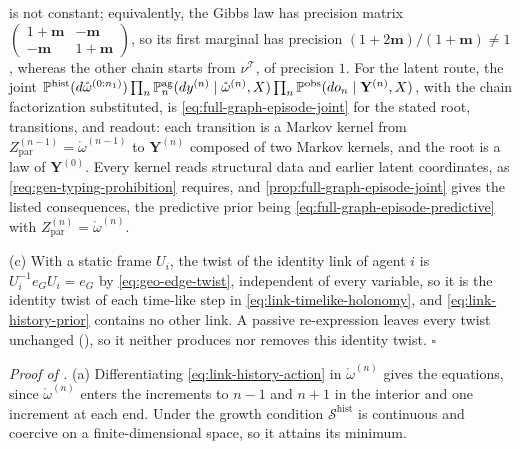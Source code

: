 is not constant; equivalently, the Gibbs law has precision matrix
$\left(\begin{smallmatrix}1+\mathbf m&-\mathbf m\\-\mathbf m&1+\mathbf m\end{smallmatrix}\right)$, so
its first marginal has precision $(1+2\mathbf m)/(1+\mathbf m)\neq1$, whereas the other chain starts
from $\nu^{\mathscr T}$, of precision $1$. For the
latent route, the joint
$\mathbb P^{\mathrm{hist}}(d\mathring\omega^{(0:n_1)})\prod_n\mathbb P^{\mathrm{ag}}_n(dy^{(n)}\mid\mathring\omega^{(n)},X)\prod_n\mathbb P^{\mathrm{obs}}(do_n\mid\mathbf Y^{(n)},X)$,
with the chain factorization substituted, is \eqref{eq:full-graph-episode-joint} for the stated root,
transitions, and readout: each transition is a Markov kernel from
$Z^{(n-1)}_{\mathrm{par}}=\mathring\omega^{(n-1)}$ to $\mathbf Y^{(n)}$ composed of two Markov kernels,
and the root is a law of $\mathbf Y^{(0)}$. Every kernel reads structural data and earlier latent
coordinates, as \cref{req:gen-typing-prohibition} requires, and \cref{prop:full-graph-episode-joint}
gives the listed consequences, the predictive prior being
\eqref{eq:full-graph-episode-predictive} with $Z^{(n)}_{\mathrm{par}}=\mathring\omega^{(n)}$.

(c) With a static frame $U_i$, the twist of the identity link of agent $i$ is
$U_i^{-1}e_GU_i=e_G$ by \eqref{eq:geo-edge-twist}, independent of every variable, so it is the
identity twist of each time-like step in \eqref{eq:link-timelike-holonomy}, and
\eqref{eq:link-history-prior} contains no other link. A passive re-expression leaves every twist
unchanged (), so it neither produces nor removes this identity
twist. \hfill$\square$

\noindent\emph{Proof of .}
(a) Differentiating \eqref{eq:link-history-action} in $\mathring\omega^{(n)}$ gives the equations,
since $\mathring\omega^{(n)}$ enters the increments to $n-1$ and $n+1$ in the interior and one increment
at each end. Under the growth condition $\mathscr S^{\mathrm{hist}}$ is continuous and coercive on a finite-dimensional
space, so it attains its minimum.

